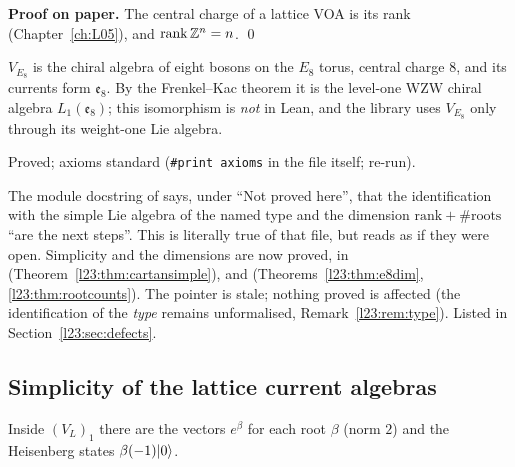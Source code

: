 \textbf{Proof on paper.} The central charge of a lattice VOA is its rank (Chapter~\ref{ch:L05}), and $\mathrm{rank}\,{\mathbb{Z}}^n=n$. \qed

\begin{physics}
$V_{E_8}$ is the chiral algebra of eight bosons on the $E_8$ torus, central charge $8$, and its currents form $\mathfrak e_8$. By the
Frenkel--Kac theorem it is the level-one WZW chiral algebra $L_1(\mathfrak e_8)$; this isomorphism is \emph{not} in Lean, and the
library uses $V_{E_8}$ only through its weight-one Lie algebra.
\end{physics}

\begin{status}
Proved; axioms standard (\texttt{\#print axioms} in the file itself;  re-run).
\end{status}

\begin{warning}[title={Trap: stale docstring in \texttt{DeligneLatticeLie.lean}}]\label{l23:warn:stalelattice}
The module docstring of  says, under ``Not proved here'', that the
identification with the simple Lie algebra of the named type and the dimension $\mathrm{rank}+\#\text{roots}$ ``are the next steps''. This is
literally true of that file, but reads as if they were open. Simplicity and the dimensions are now proved, in  (Theorem~\ref{l23:thm:cartansimple}),
 and  (Theorems~\ref{l23:thm:e8dim}, \ref{l23:thm:rootcounts}). The pointer is stale;
nothing proved is affected (the identification of the \emph{type} remains unformalised, Remark~\ref{l23:rem:type}). Listed in
Section~\ref{l23:sec:defects}.
\end{warning}

\subsection{Simplicity of the lattice current algebras}

Inside $(V_L)_1$ there are the vectors $e^\beta$ for each root $\beta$ (norm $2$) and the Heisenberg states $\beta(-1)|0\rangle$.

